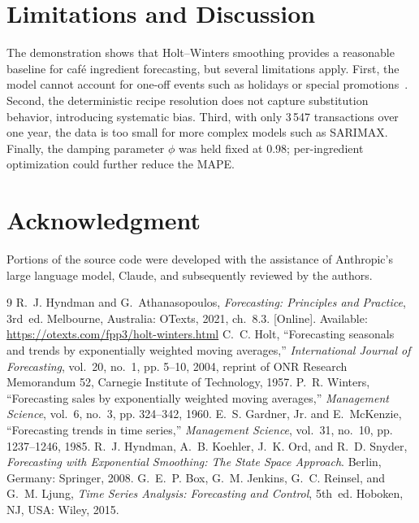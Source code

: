 \documentclass[conference]{IEEEtran}
\begin{document}
\section*{Limitations and Discussion}
The demonstration shows that Holt--Winters smoothing provides a reasonable baseline
for caf\'e ingredient forecasting, but several limitations apply. First, the model
cannot account for one-off events such as holidays or special promotions~\cite{box2015}.
Second, the deterministic recipe resolution does not capture substitution behavior,
introducing systematic bias. Third, with only 3\,547 transactions over one year, the
data is too small for more complex models such as SARIMAX. Finally, the damping
parameter $\phi$ was held fixed at 0.98; per-ingredient optimization could further
reduce the MAPE.

\section*{Acknowledgment}
Portions of the source code were developed with the assistance of Anthropic's large
language model, Claude, and subsequently reviewed by the authors.

\begin{thebibliography}{9}
 R.~J. Hyndman and G.~Athanasopoulos,
\emph{Forecasting: Principles and Practice}, 3rd~ed. Melbourne, Australia: OTexts, 2021,
ch.~8.3. [Online]. Available: \url{https://otexts.com/fpp3/holt-winters.html}
 C.~C. Holt, ``Forecasting seasonals and trends by exponentially
weighted moving averages,'' \emph{International Journal of Forecasting}, vol.~20,
no.~1, pp. 5--10, 2004, reprint of ONR Research Memorandum 52, Carnegie Institute
of Technology, 1957.
 P.~R. Winters, ``Forecasting sales by exponentially weighted
moving averages,'' \emph{Management Science}, vol.~6, no.~3, pp. 324--342, 1960.
 E.~S. Gardner, Jr. and E.~McKenzie, ``Forecasting trends in
time series,'' \emph{Management Science}, vol.~31, no.~10, pp. 1237--1246, 1985.
R.~J. Hyndman, A.~B. Koehler, J.~K. Ord, and R.~D. Snyder,
\emph{Forecasting with Exponential Smoothing: The State Space Approach}.
Berlin, Germany: Springer, 2008.
 G.~E.~P. Box, G.~M. Jenkins, G.~C. Reinsel, and G.~M. Ljung,
\emph{Time Series Analysis: Forecasting and Control}, 5th~ed. Hoboken, NJ, USA: Wiley, 2015.
\end{thebibliography}
\end{document}
